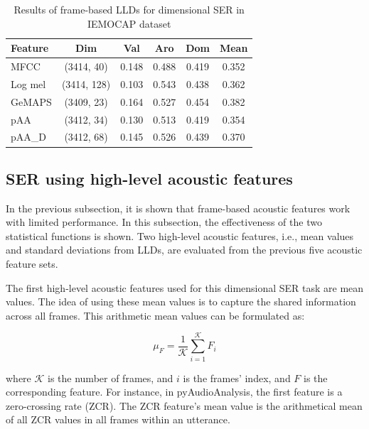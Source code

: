\begin{table}
    \caption{Results of frame-based LLDs for dimensional SER in IEMOCAP dataset}
    \begin{center}
    \begin{tabular}{l | c | c c c c}
      \hline 
Feature & Dim & Val & Aro & Dom & Mean \\
\hline \hline
MFCC      & (3414, 40)    &0.148    & 0.488   & 0.419   & 0.352 \\
Log mel   & (3414, 128)   &0.103    & 0.543   & 0.438   & 0.362 \\
GeMAPS    & (3409, 23)    &0.164    & 0.527   & 0.454   & 0.382 \\
pAA       & (3412, 34)    &0.130    & 0.513   & 0.419   & 0.354 \\
pAA\_D    & (3412, 68)    &0.145    & 0.526   & 0.439   & 0.370 \\
      \hline
    \end{tabular}
    \label{tab:iemocap-lld}
  \end{center}
\end{table}




\subsection{SER using high-level acoustic features}
In the previous subsection, it is shown that frame-based acoustic features work
with limited performance. In this subsection, the effectiveness of the two
statistical functions is shown. Two high-level acoustic features, i.e., mean
values and standard deviations from LLDs, are evaluated from the previous five
acoustic feature sets. 

The first high-level acoustic features used for this dimensional SER task are
mean values. The idea of using these mean values is to capture the shared
information across all frames. This arithmetic mean values can be formulated
as: 

\begin{equation}
  \mu_F = \frac{1}{\mathcal{K}}\sum _{i=1}^\mathcal{K} F_i  
\end{equation}

\noindent where $\mathcal{K}$ is the number of frames,  and $i$ is the frames'
index, and $F$ is the corresponding feature.  For instance, in pyAudioAnalysis,
the first feature is a zero-crossing rate (ZCR).  The ZCR feature's mean value
is the arithmetical mean of all ZCR values in all frames within an utterance.  

